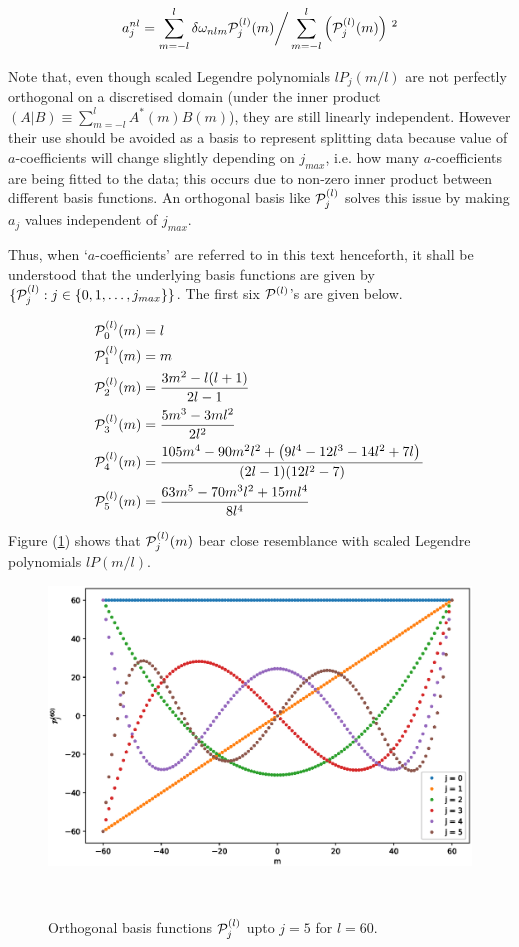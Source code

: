 \begin{equation}
a^{nl}_j = \sum_{m=-l}^l \delta\omega_{nlm}\mathcal{P}^{(l)}_j(m) \bigg/ \sum_{m=-l}^l \left( \mathcal{P}^{(l)}_j(m) \right)\,^2
\end{equation}


Note that, even though scaled Legendre polynomials $lP_j(m/l)$ are not perfectly orthogonal on a discretised domain (under the inner product $(A|B)\equiv\sum_{m=-l}^l A^*(m)B(m)$), they are still linearly independent. However their use should be avoided as a basis to represent splitting data because value of $a$-coefficients will change slightly depending on $j_{max}$, i.e. how many $a$-coefficients are being fitted to the data; this occurs due to non-zero inner product between different basis functions. An orthogonal basis like $\mathcal{P}^{(l)}_j$ solves this issue by making $a_j$ values independent of $j_{max}$.

Thus, when `$a$-coefficients' are referred to in this text henceforth, it shall be understood that the underlying basis functions are given by $\{\mathcal{P}^{(l)}_j: j\in \{0,1,\dots,j_{max}\}\}$. The first six $\mathcal{P}^{(l)}$'s are given below.

\begin{align}
\mathcal{P}^{(l)}_{0}(m) &= l \\
\mathcal{P}^{(l)}_1(m) &= m \\
\mathcal{P}^{(l)}_2(m) &= \frac{3m^2-l(l+1)}{2l-1} \\
\mathcal{P}^{(l)}_3(m) &= \frac{5m^3-3ml^2}{2l^2} \\
\mathcal{P}^{(l)}_4(m) &= \frac{105m^4 - 90m^2 l^2 + \left( 9l^4 -12l^3 -14l^2+ 7l \right)\,}{(2l-1)(12l^2-7)} \\
\mathcal{P}^{(l)}_5(m) &= \frac{63m^5 - 70m^3l^2 + 15ml^4}{8l^4}
\end{align}

Figure (\ref{fig:curly_p}) shows that $\mathcal{P}^{(l)}_j(m)$ bear close resemblance with scaled Legendre polynomials $lP(m/l)$.
\begin{figure}[h]
\includegraphics[scale=0.6, center]{Chapter1/figs/curly_p}
\caption{Orthogonal basis functions $\mathcal{P}^{(l)}_{j}$ upto $j=5$ for $l=60$.}\
\label{fig:curly_p}
\end{figure}
